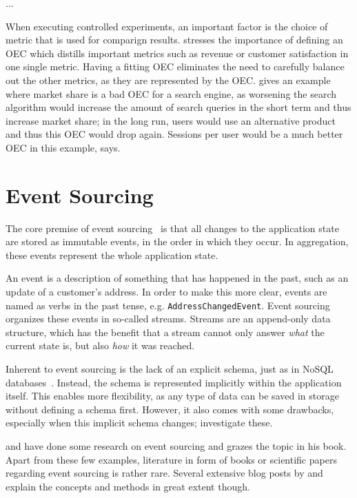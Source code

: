 ...

When executing controlled experiments, an important factor is the choice of metric that is used for comparign results.
\citet{Kohavi2013a} stresses the importance of defining an \ac{OEC} which distills important metrics such as revenue or customer satisfaction in one single metric.
Having a fitting \ac{OEC} eliminates the need to carefully balance out the other metrics, as they are represented by the \ac{OEC}.
\citeauthor{Kohavi2013a} gives an example where market share is a bad \ac{OEC} for a search engine, as worsening the search algorithm would increase the amount of search queries in the short term and thus increase market share; in the long run, users would use an alternative product and thus this \ac{OEC} would drop again.
Sessions per user would be a much better \ac{OEC} in this example, \citeauthor{Kohavi2013a} says.


\section{Event Sourcing}
\label{sec:fundamentals:event}

The core premise of event sourcing~\cite{WEB:Fowler:2005} is that all changes to the application state are stored as immutable events, in the order in which they occur.
In aggregation, these events represent the whole application state.

An event is a description of something that has happened in the past, such as an update of a customer's address.
In order to make this more clear, events are named as verbs in the past tense, e.g. \texttt{AddressChangedEvent}.
Event sourcing organizes these events in so-called streams.
Streams are an append-only data structure, which has the benefit that a stream cannot only answer \emph{what} the current state is, but also \emph{how} it was reached.

Inherent to event sourcing is the lack of an explicit schema, just as in NoSQL databases~\cite{fowler2013schemaless}.
Instead, the schema is represented implicitly within the application itself.
This enables more flexibility, as any type of data can be saved in storage without defining a schema first.
However, it also comes with some drawbacks, especially when this implicit schema changes; \citet{Overeem2017} investigate these.

\citet{Overeem2017} and \citet{Erb2016} have done some research on event sourcing and \citet{evans2004domain} grazes the topic in his book.
Apart from these few examples, literature in form of books or scientific papers regarding event sourcing is rather rare.
Several extensive blog posts by \citet{WEB:Fowler:2005} and \citet{young2010whyeventsourcing} explain the concepts and methods in great extent though.

